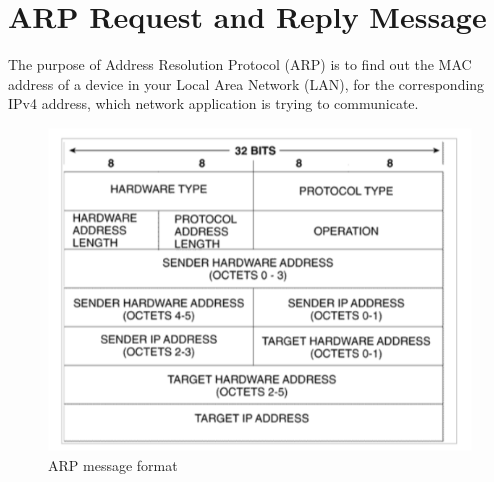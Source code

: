 \documentclass{article}
\begin{document}
\section{ARP Request and Reply Message }

The purpose of Address Resolution Protocol (ARP) is to find out the MAC address of a device in your Local Area Network (LAN), for the corresponding IPv4 address, which network application is trying to communicate.

\begin{figure}[h]
    \centering
\includegraphics[width=\textwidth]{images/arp_2.png}
\captioig ARP message format 
\end{figure}
\end{document}
